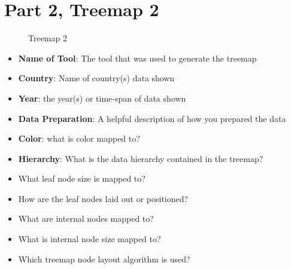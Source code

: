 \hypertarget{part-2-treemap-2}{%
\section{Part 2, Treemap 2}\label{part-2-treemap-2}}

\begin{figure}
\centering
\caption{Treemap 2}
\end{figure}

\begin{itemize}
\tightlist
\item
  \textbf{Name of Tool}: The tool that was used to generate the treemap
\item
  \textbf{Country}: Name of country(s) data shown
\item
  \textbf{Year}: the year(s) or time-span of data shown
\item
  \textbf{Data Preparation}: A helpful description of how you prepared
  the data
\item
  \textbf{Color}: what is color mapped to?
\item
  \textbf{Hierarchy}: What is the data hierarchy contained in the
  treemap?
\item
  What leaf node size is mapped to?
\item
  How are the leaf nodes laid out or positioned?
\item
  What are internal nodes mapped to?
\item
  What is internal node size mapped to?
\item
  Which treemap node layout algorithm is used?
\end{itemize}
